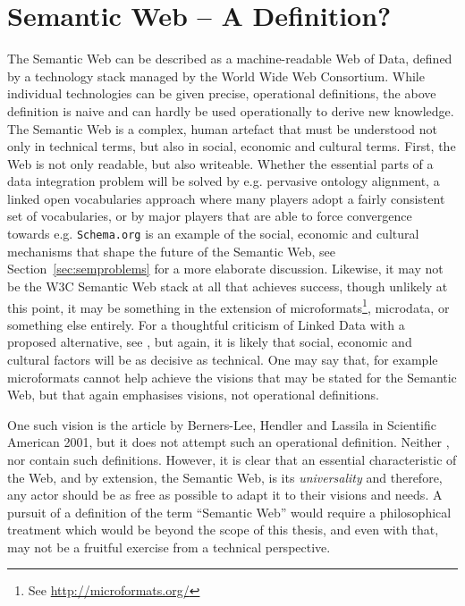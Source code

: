 \section{Semantic Web -- A Definition?}\label{sec:nodef}

The Semantic Web can be described as a machine-readable Web of Data,
defined by a technology stack managed by the World Wide Web
Consortium. While individual technologies can be given precise,
operational definitions, the above definition is naive and can hardly
be used operationally to derive new knowledge. The Semantic Web is a
complex, human artefact that must be understood not only in technical
terms, but also in social, economic and cultural terms. First, the Web
is not only readable, but also writeable. Whether the essential parts
of a data integration problem will be solved by e.g. pervasive
ontology alignment, a linked open vocabularies approach where many
players adopt a fairly consistent set of vocabularies, or by major
players that are able to force convergence towards e.g. \texttt{Schema.org}
is an example of the social, economic and cultural mechanisms that
shape the future of the Semantic Web, see
Section~\ref{sec:semproblems} for a more elaborate
discussion. Likewise, it may not be the W3C Semantic Web stack at all
that achieves success, though unlikely at this point, it may be
something in the extension of microformats\footnote{See
  \url{http://microformats.org/}}, microdata\cite{microdata}, or
something else entirely. For a thoughtful criticism of Linked Data
with a proposed alternative, see \cite{darobin1}, but again, it is
likely that social, economic and cultural factors will be as decisive
as technical. One may say that, for example microformats cannot help achieve
the visions that may be stated for the Semantic Web, but that again
emphasises visions, not operational definitions.

One such vision is the article by Berners-Lee, Hendler and Lassila in
Scientific American 2001\cite{berners2001semantic}, but it does not attempt such an
operational definition. Neither \cite{semwebroadmap},
\cite{berners2000weaving} nor \cite{Allemang:2008:SWW:1386668} contain
such definitions. However, it is clear that an essential
characteristic of the Web, and by extension, the Semantic Web, is its
\emph{universality} and therefore, any actor should be as free as
possible to adapt it to their visions and needs. A pursuit of a
definition of the term ``Semantic Web'' would require a philosophical
treatment which would be beyond the scope of this thesis, and even
with that, may not be a fruitful exercise from a technical
perspective. 

